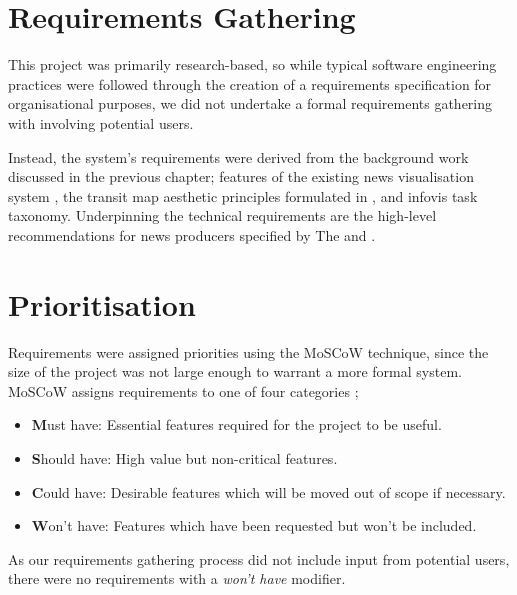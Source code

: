 \section{Requirements Gathering}
This project was primarily research-based, so while typical software engineering practices were followed through the creation of a requirements specification for organisational purposes, we did not undertake a formal requirements gathering with involving potential users.

Instead, the system's requirements were derived from the background work discussed in the previous chapter; features of the existing news visualisation system \citep{GeneratingInformationMaps}, the transit map aesthetic principles formulated in \citep{AutomaticMetroMapLayoutThesis, AutomaticMetroMapLayout}, and  infovis task taxonomy. Underpinning the technical requirements are the high-level recommendations for news producers specified by The \cite{anewmodelfornews} and \cite{overloadjournalismsbattle}. 

\section{Prioritisation}
Requirements were assigned priorities using the MoSCoW technique, since the size of the project was not large enough to warrant a more formal system. MoSCoW assigns requirements to one of four categories \citep{PrioritizationUsingMoscow};
\begin{itemize}[noitemsep]
	\item\textbf{M}ust have: Essential features required for the project to be useful.
	\item\textbf{S}hould have: High value but non-critical features.
	\item\textbf{C}ould have: Desirable features which will be moved out of scope if necessary.
	\item\textbf{W}on't have: Features which have been requested but won't be included. 
\end{itemize}
As our requirements gathering process did not include input from potential users, there were no requirements with a \textit{won't have} modifier.

